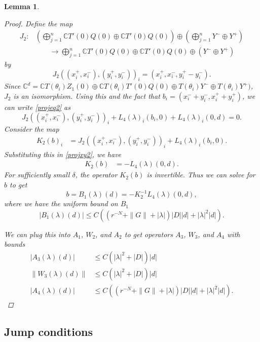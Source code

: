 \documentclass[12pt]{elsarticle}
\def\C{{\mathbb C}}
\newtheorem{lemma}{Lemma}
\begin{document}
\begin{lemma}
\begin{proof}
Define the map
\begin{align*}
J_2: &\left( \bigoplus_{j=1}^n \C T'(0)Q(0) \oplus \C T'(0)Q(0) \right) \oplus
\left( \bigoplus_{j=1}^n Y^- \oplus Y^+ \right)  \\
&\qquad\rightarrow \bigoplus_{j=1}^n \C T'(0)Q(0) \oplus \C T'(0)Q(0) \oplus (Y^- \oplus Y^+)
\end{align*}
by 
\[
J_2( (x_i^+, x_i^-),(y_i^+, y_i^-))_i = ( x_i^+, x_i^-, y_i^+ - y_i^- ).
\]
Since $\C^d = \C T(\theta_i) Z_1(0) \oplus \C T(\theta_i) T'(0)Q(0) \oplus T(\theta_i) Y^- \oplus T(\theta_i) Y^+)$, $J_2$ is an isomorphism. Using this and the fact that $b_i = (x_i^- + y_i^-, x_i^+ + y_i^+)$, we can write \cref{projeq2} as
\begin{equation}\label{projxy2}
J_2( (x_i^+, x_i^-),(y_i^+, y_i^-))_i 
+ L_4(\lambda)_i(b_i, 0) + L_4(\lambda)_i(0, d) = 0.
\end{equation}
Consider the map
\begin{align*}
K_2(b)_i &= J_2( (x_i^+, x_i^-),(y_i^+, y_i^-))_i 
+ L_4(\lambda)_i(b_i, 0). 
\end{align*}
Substituting this in \cref{projxy2}, we have
\begin{align*}
K_2(b) &= -L_4(\lambda)(0, d).
\end{align*}
For sufficiently small $\delta$, the operator $K_2(b)$ is invertible. Thus we can solve for $b$ to get
\begin{equation}
b = B_1(\lambda)(d) = -K_2^{-1} L_4(\lambda)(0, d),
\end{equation}
where we have the uniform bound on $B_1$
\begin{equation}
|B_1(\lambda)(d)| \leq C \left( (r^{-N} + \|G\| + |\lambda|)|D| |d| + |\lambda|^2 |d| \right) .
\end{equation}

We can plug this into $A_1$, $W_2$, and $A_2$ to get operators $A_3$, $W_3$, and $A_4$ with bounds
\begin{align*}
|A_3(\lambda)(d)| &\leq C \left(|\lambda|^2 + |D|\right)|d|\\
\|W_3(\lambda)(d)\| &\leq C \left(|\lambda|^2 + |D|\right)|d| \\
|A_4(\lambda)(d)| &\leq 
C\left( (r^{-N} + \|G\| + |\lambda|)|D||d| + |\lambda|^2 |d|  \right).
\end{align*}
\end{proof}
\end{lemma}

\subsection{Jump conditions}
\end{document}
